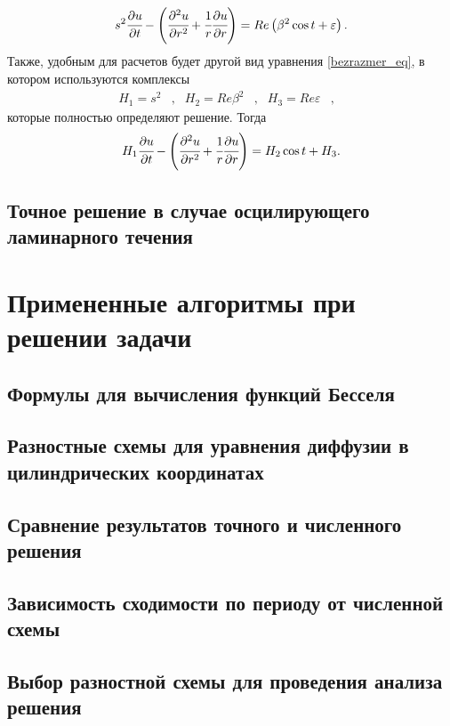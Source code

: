 \documentclass[12pt]{article}
\begin{document}
\begin{equation}
\label{bezrazmer_eq}
s^2\cfrac{\partial u}{\partial t}-\left(\cfrac{\partial^2u}{\partial r^2}+\cfrac{1}{r}\cfrac{\partial u}{\partial r}\right)=Re\left(\beta^2\cos t+\varepsilon\right).
\end{equation}
Также, удобным для расчетов будет другой вид уравнения \eqref{bezrazmer_eq}, в котором используются комплексы
\begin{equation*}
\begin{array}{lllllll}
H_1=s^2&,&
H_2=Re\beta^2&,&
H_3=Re\varepsilon&,&
\end{array}
\end{equation*}
которые полностью определяют решение. 
Тогда
\begin{equation}
\label{bezrazmer_eq_withH}
H_1\cfrac{\partial u}{\partial t}-\left(\cfrac{\partial^2u}{\partial r^2}+\cfrac{1}{r}\cfrac{\partial u}{\partial r}\right)=H_2\cos t+H_3.
\end{equation}
\subsection{Точное решение в случае осцилирующего ламинарного течения}
\newpage
\section{Примененные алгоритмы при решении задачи}
\subsection{Формулы для вычисления функций Бесселя}
\subsection{Разностные схемы для уравнения диффузии в цилиндрических координатах}
\subsection{Сравнение результатов точного и численного решения}
\subsection{Зависимость сходимости по периоду от численной схемы}
\subsection{Выбор разностной схемы для проведения анализа решения}
\newpage
\end{document}
